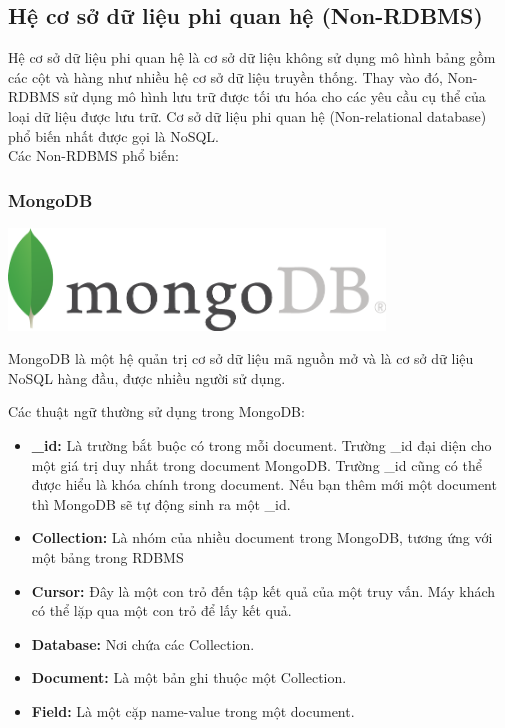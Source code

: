 \subsection{Hệ cơ sở dữ liệu phi quan hệ (Non-RDBMS)}
Hệ cơ sở dữ liệu phi quan hệ là cơ sở dữ liệu không sử dụng mô hình bảng gồm các cột và hàng như nhiều hệ cơ sở dữ liệu truyền thống. Thay vào đó, Non-RDBMS sử dụng mô hình lưu trữ được tối ưu hóa cho các yêu cầu cụ thể của loại dữ liệu được lưu trữ. Cơ sở dữ liệu phi quan hệ (Non-relational database) phổ biến nhất được gọi là NoSQL.\\
Các Non-RDBMS phổ biến:
\subsubsection{MongoDB}
\begin{center}
  \captionsetup{type=figure}
    \includegraphics[width=10cm]{img/mongo.png}
\end{center}

MongoDB là một hệ quản trị cơ sở dữ liệu mã nguồn mở và là cơ sở dữ liệu NoSQL hàng đầu, được nhiều người sử dụng.

Các thuật ngữ thường sử dụng trong MongoDB:
\begin{itemize}
    \item \textbf{\_id:} Là trường bắt buộc có trong mỗi document. Trường \_id đại diện cho một giá trị duy nhất trong document MongoDB. Trường \_id cũng có thể được hiểu là khóa chính trong document. Nếu bạn thêm mới một document thì MongoDB sẽ tự động sinh ra một \_id.
    \item \textbf{Collection:} Là nhóm của nhiều document trong MongoDB, tương ứng với một bảng trong RDBMS
    \item \textbf{Cursor:} Đây là một con trỏ đến tập kết quả của một truy vấn. Máy khách có thể lặp qua một con trỏ để lấy kết quả.
    \item \textbf{Database:} Nơi chứa các Collection.
    \item \textbf{Document:} Là một bản ghi thuộc một Collection.
    \item \textbf{Field:} Là một cặp name-value trong một document.
\end{itemize}

